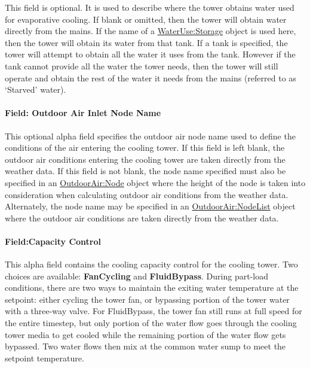 This field is optional. It is used to describe where the tower obtains water used for evaporative cooling. If blank or omitted, then the tower will obtain water directly from the mains. If the name of a \hyperref[waterusestorage]{WaterUse:Storage} object is used here, then the tower will obtain its water from that tank. If a tank is specified, the tower will attempt to obtain all the water it uses from the tank. However if the tank cannot provide all the water the tower needs, then the tower will still operate and obtain the rest of the water it needs from the mains (referred to as `Starved' water).

\paragraph{Field: Outdoor Air Inlet Node Name}\label{field-outdoor-air-inlet-node-name-000}

This optional alpha field specifies the outdoor air node name used to define the conditions of the air entering the cooling tower. If this field is left blank, the outdoor air conditions entering the cooling tower are taken directly from the weather data. If this field is not blank, the node name specified must also be specified in an \hyperref[outdoorairnode]{OutdoorAir:Node} object where the height of the node is taken into consideration when calculating outdoor air conditions from the weather data. Alternately, the node name may be specified in an \hyperref[outdoorairnodelist]{\hyperref[outdoorairnode]{OutdoorAir:Node}List} object where the outdoor air conditions are taken directly from the weather data.

\paragraph{Field:Capacity Control}\label{fieldcapacity-control}

This alpha field contains the cooling capacity control for the cooling tower. Two choices are available: \textbf{FanCycling} and \textbf{FluidBypass}. During part-load conditions, there are two ways to maintain the exiting water temperature at the setpoint: either cycling the tower fan, or bypassing portion of the tower water with a three-way valve. For FluidBypass, the tower fan still runs at full speed for the entire timestep, but only portion of the water flow goes through the cooling tower media to get cooled while the remaining portion of the water flow gets bypassed. Two water flows then mix at the common water sump to meet the setpoint temperature.

